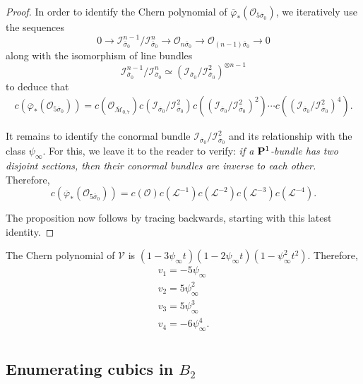 \documentclass[12pt,reqno]{amsart}
\DeclareMathOperator{\M}{\mathcal{M}}
\renewcommand{\to}{{\longrightarrow}}
\numberwithin{equation}{section}
\renewcommand{\O}{\mathcal O}
\newcommand{\V}{\mathcal V}
\renewcommand {\o}[1]{\overline{#1}}
\begin{document}
\begin{proof}
  In order to identify the Chern polynomial of
  $\o{\varphi}_{*}(\O_{5 \o{\sigma}_{0}})$, we iteratively use the
  sequences
  $$0 \to \mathcal{I}_{\o{\sigma}_{0}}^{n-1}/\mathcal{I}_{\o{\sigma}_{0}}^{n} \to \O_{n\o{\sigma}_{0}} \to \O_{(n-1)\o{\sigma}_{0}} \to 0$$ along with the isomorphism of line bundles
  $$\mathcal{I}_{\o{\sigma}_{0}}^{n-1}/\mathcal{I}_{\o{\sigma}_{0}}^{n} \simeq (\mathcal{I}_{\o{\sigma}_{0}}/\mathcal{I}_{\o{\sigma}_{0}}^{2})^{\otimes n-1}$$ to deduce that
  \begin{align}
    \label{eq:rk5}
    c(\o{\varphi}_{*}(\O_{5 \o{\sigma}_{0}})) = c(\O_{\o{\M}_{0,7}})c(\mathcal{I}_{\o{\sigma}_{0}}/\mathcal{I}_{\o{\sigma}_{0}}^{2})c((\mathcal{I}_{\o{\sigma}_{0}}/\mathcal{I}_{\o{\sigma}_{0}}^{2})^{2})\cdots c((\mathcal{I}_{\o{\sigma}_{0}}/\mathcal{I}_{\o{\sigma}_{0}}^{2})^{4}).
  \end{align}

  It remains to identify the conormal bundle
  $\mathcal{I}_{\o{\sigma}_{0}}/\mathcal{I}_{\o{\sigma}_{0}}^{2}$ and
  its relationship with the class $\psi_{\infty}$. For this, we leave
  it to the reader to verify: {\sl if a $\P^{1}$-bundle has two
    disjoint sections, then their conormal bundles are inverse to each
    other.}  Therefore,
  $$c(\o{\varphi}_{*}(\O_{5 \o{\sigma}_{0}})) = c(\O)c(\mathcal{L}^{-1})c(\mathcal{L}^{-2})c(\mathcal{L}^{-3})c(\mathcal{L}^{-4}).$$

  The proposition now follows by tracing backwards, starting with this
  latest identity.
\end{proof}

\begin{corollary}
  \label{cor:chernpolyV2} The Chern polynomial of $\V$ is
  $(1-3\psi_{\infty}t)(1-2
  \psi_{\infty}t)(1-\psi_{\infty}^{2}t^{2})$. Therefore,
  \begin{align}
    \label{eq:chernV2}
    v_1 = -5\psi_{\infty}\\
    v_2 = 5 \psi_{\infty}^{2}\\ \nonumber
    v_3 = 5 \psi_{\infty}^{3}\\ \nonumber
    v_{4} = -6 \psi_{\infty}^{4}.\\ \nonumber
  \end{align}
\end{corollary}

\subsection{Enumerating cubics in $B_{2}$}
\label{sec:enum-cubics-b_2}
\end{document}
